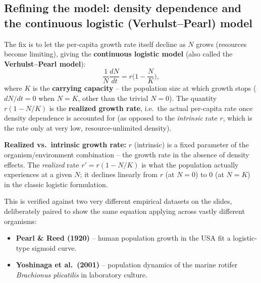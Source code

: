 \documentclass[11pt,a4paper]{article}
\begin{document}
\subsection{Refining the model: density dependence and the continuous logistic (Verhulst--Pearl) model}
The fix is to let the per-capita growth rate itself decline as $N$ grows (resources become limiting), giving the \textbf{continuous logistic model} (also called the \textbf{Verhulst--Pearl model}):
\[
\frac{1}{N}\frac{dN}{dt} = r\Big(1 - \frac{N}{K}\Big),
\]
where $K$ is the \textbf{carrying capacity} -- the population size at which growth stops ($dN/dt = 0$ when $N=K$, other than the trivial $N=0$). The quantity $r(1-N/K)$ is the \textbf{realized growth rate}, i.e.\ the actual per-capita rate once density dependence is accounted for (as opposed to the \emph{intrinsic} rate $r$, which is the rate only at very low, resource-unlimited density).

\begin{keybox}
\textbf{Realized vs.\ intrinsic growth rate:} $r$ (intrinsic) is a fixed parameter of the organism/environment combination -- the growth rate in the absence of density effects. The \emph{realized} rate $r' = r(1-N/K)$ is what the population actually experiences at a given $N$; it declines linearly from $r$ (at $N=0$) to $0$ (at $N=K$) in the classic logistic formulation.
\end{keybox}

This is verified against two very different empirical datasets on the slides, deliberately paired to show the same equation applying across vastly different organisms:
\begin{itemize}[leftmargin=1.5em]
\item \textbf{Pearl \& Reed (1920)} -- human population growth in the USA fit a logistic-type sigmoid curve.
\item \textbf{Yoshinaga et al.\ (2001)} -- population dynamics of the marine rotifer \emph{Brachionus plicatilis} in laboratory culture.
\end{itemize}
\end{document}
